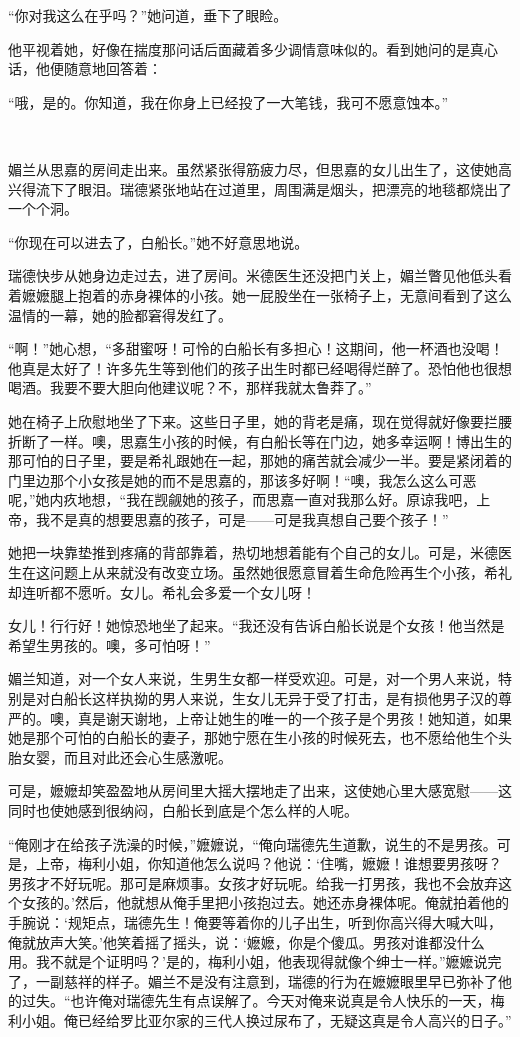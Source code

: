 \par “你对我这么在乎吗？”她问道，垂下了眼睑。
\par 他平视着她，好像在揣度那问话后面藏着多少调情意味似的。看到她问的是真心话，他便随意地回答着：
\par “哦，是的。你知道，我在你身上已经投了一大笔钱，我可不愿意蚀本。”
\par  
\par 媚兰从思嘉的房间走出来。虽然紧张得筋疲力尽，但思嘉的女儿出生了，这使她高兴得流下了眼泪。瑞德紧张地站在过道里，周围满是烟头，把漂亮的地毯都烧出了一个个洞。
\par “你现在可以进去了，白船长。”她不好意思地说。
\par 瑞德快步从她身边走过去，进了房间。米德医生还没把门关上，媚兰瞥见他低头看着嬷嬷腿上抱着的赤身裸体的小孩。她一屁股坐在一张椅子上，无意间看到了这么温情的一幕，她的脸都窘得发红了。
\par “啊！”她心想，“多甜蜜呀！可怜的白船长有多担心！这期间，他一杯酒也没喝！他真是太好了！许多先生等到他们的孩子出生时都已经喝得烂醉了。恐怕他也很想喝酒。我要不要大胆向他建议呢？不，那样我就太鲁莽了。”
\par 她在椅子上欣慰地坐了下来。这些日子里，她的背老是痛，现在觉得就好像要拦腰折断了一样。噢，思嘉生小孩的时候，有白船长等在门边，她多幸运啊！博出生的那可怕的日子里，要是希礼跟她在一起，那她的痛苦就会减少一半。要是紧闭着的门里边那个小女孩是她的而不是思嘉的，那该多好啊！“噢，我怎么这么可恶呢，”她内疚地想，“我在觊觎她的孩子，而思嘉一直对我那么好。原谅我吧，上帝，我不是真的想要思嘉的孩子，可是——可是我真想自己要个孩子！”
\par 她把一块靠垫推到疼痛的背部靠着，热切地想着能有个自己的女儿。可是，米德医生在这问题上从来就没有改变立场。虽然她很愿意冒着生命危险再生个小孩，希礼却连听都不愿听。女儿。希礼会多爱一个女儿呀！
\par 女儿！行行好！她惊恐地坐了起来。“我还没有告诉白船长说是个女孩！他当然是希望生男孩的。噢，多可怕呀！”
\par 媚兰知道，对一个女人来说，生男生女都一样受欢迎。可是，对一个男人来说，特别是对白船长这样执拗的男人来说，生女儿无异于受了打击，是有损他男子汉的尊严的。噢，真是谢天谢地，上帝让她生的唯一的一个孩子是个男孩！她知道，如果她是那个可怕的白船长的妻子，那她宁愿在生小孩的时候死去，也不愿给他生个头胎女婴，而且对此还会心生感激呢。
\par 可是，嬷嬷却笑盈盈地从房间里大摇大摆地走了出来，这使她心里大感宽慰——这同时也使她感到很纳闷，白船长到底是个怎么样的人呢。
\par “俺刚才在给孩子洗澡的时候，”嬷嬷说，“俺向瑞德先生道歉，说生的不是男孩。可是，上帝，梅利小姐，你知道他怎么说吗？他说：‘住嘴，嬷嬷！谁想要男孩呀？男孩才不好玩呢。那可是麻烦事。女孩才好玩呢。给我一打男孩，我也不会放弃这个女孩的。’然后，他就想从俺手里把小孩抱过去。她还赤身裸体呢。俺就拍着他的手腕说：‘规矩点，瑞德先生！俺要等着你的儿子出生，听到你高兴得大喊大叫，俺就放声大笑。’他笑着摇了摇头，说：‘嬷嬷，你是个傻瓜。男孩对谁都没什么用。我不就是个证明吗？’是的，梅利小姐，他表现得就像个绅士一样。”嬷嬷说完了，一副慈祥的样子。媚兰不是没有注意到，瑞德的行为在嬷嬷眼里早已弥补了他的过失。“也许俺对瑞德先生有点误解了。今天对俺来说真是令人快乐的一天，梅利小姐。俺已经给罗比亚尔家的三代人换过尿布了，无疑这真是令人高兴的日子。”
